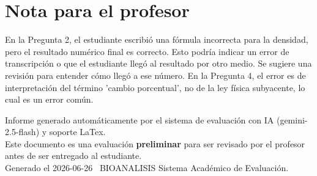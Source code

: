 \documentclass[11pt,a4paper]{article}
\begin{document}
\section*{Nota para el profesor}
\begin{tcolorbox}[
  enhanced, breakable,
  colback=yellow!8, colframe=yellow!60!black,
  fonttitle=\bfseries, coltitle=black,
  title={Observaciones para revisión manual},
  top=4pt, bottom=4pt, left=8pt, right=8pt,
]
En la Pregunta 2, el estudiante escribió una fórmula incorrecta para la densidad, pero el resultado numérico final es correcto. Esto podría indicar un error de transcripción o que el estudiante llegó al resultado por otro medio. Se sugiere una revisión para entender cómo llegó a ese número. En la Pregunta 4, el error es de interpretación del término 'cambio porcentual', no de la ley física subyacente, lo cual es un error común.
\end{tcolorbox}

\vspace{12pt}
\begin{center}
  \footnotesize\color{gray}
  Informe generado automáticamente por el sistema de evaluación con IA (gemini-2.5-flash) y soporte LaTex. \\
  Este documento es una evaluación \textbf{preliminar} para ser revisado por el profesor antes de ser entregado al 
  estudiante. \\
  Generado el 2026-06-26 \textbullet\ BIOANALISIS Sistema Académico de Evaluación.
  \end{center}
\end{document}
